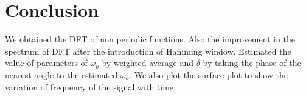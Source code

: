 \documentclass[10pt,a4paper]{article}
\begin{document}
\section{Conclusion}

We obtained the DFT of non periodic functions. Also the improvement in the spectrum of DFT after the introduction of Hamming window. Estimated the value of parameters of $\omega_o$ by  weighted average and $\delta$ by taking the phase of the nearest angle to the estimated $\omega_o$. We also plot the surface plot to show the variation of frequency of the signal with time.
\end{document}
